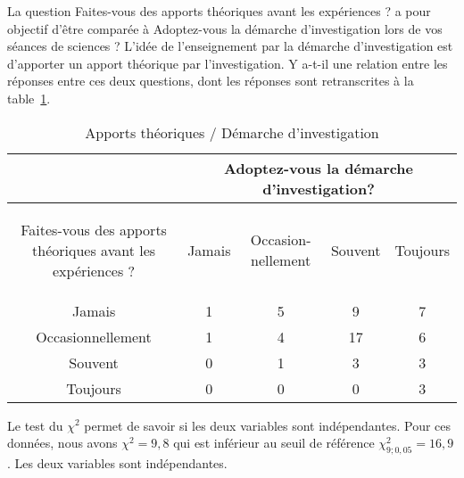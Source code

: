La question \og Faites-vous des apports théoriques avant les expériences ? \fg{} a pour objectif d’être comparée à \og Adoptez-vous la démarche d’investigation lors de vos séances de sciences ? \fg{} L’idée de l’enseignement par la démarche d’investigation est d’apporter un apport théorique par l’investigation. Y a-t-il une relation entre les réponses entre ces deux questions, dont les réponses sont retranscrites à la table~\ref{theorie}.
\begin{table}[h!btp]
\centering
\caption{\label{theorie} Apports théoriques / Démarche d’investigation}
	\begin{tabular}{|c|c|c|c|c|}
	\cline{2-5}
	\multicolumn{1}{c|}{} & \multicolumn{4}{c|}{Adoptez-vous la démarche d’investigation?} \\ 
	\hline 
	\begin{minipage}[l]{3.7cm}\begin{flushleft}Faites-vous des apports théoriques avant les expériences ?\end{flushleft}\end{minipage} & Jamais & \begin{minipage}[c]{2cm}Occasion- nellement\end{minipage} & Souvent & Toujours \\ 
	\hline 
	Jamais & 1 & 5 & 9 & 7 \\ 
	\hline 
	Occasionnellement & 1 & 4 & 17 & 6 \\ 
	\hline 
	Souvent & 0 & 1 & 3 & 3 \\ 
	\hline 
	Toujours & 0 & 0 & 0 & 3 \\ 
	\hline 
	\end{tabular}
\end{table}
Le test du $\chi^2$ permet de savoir si les deux variables sont indépendantes. Pour ces données, nous avons $\chi^2=9,8$ qui est inférieur au seuil de référence $\chi^2_{9;0,05}=16,9$. Les deux variables sont indépendantes.

